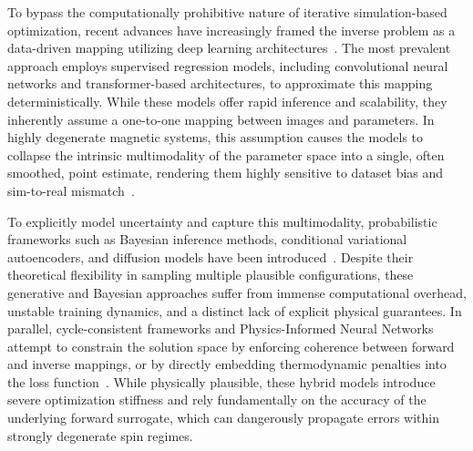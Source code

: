 \documentclass[a4paper,fleqn]{cas-sc}
\begin{document}
To bypass the computationally prohibitive nature of iterative simulation-based optimization, recent advances have increasingly framed the inverse problem as a data-driven mapping utilizing deep learning architectures~\cite{lee2024deep}. The most prevalent approach employs supervised regression models, including convolutional neural networks and transformer-based architectures, to approximate this mapping deterministically. While these models offer rapid inference and scalability, they inherently assume a one-to-one mapping between images and parameters. In highly degenerate magnetic systems, this assumption causes the models to collapse the intrinsic multimodality of the parameter space into a single, often smoothed, point estimate, rendering them highly sensitive to dataset bias and sim-to-real mismatch~\cite{chen2024data}. 

To explicitly model uncertainty and capture this multimodality, probabilistic frameworks such as Bayesian inference methods, conditional variational autoencoders, and diffusion models have been introduced~\cite{lan2022scaling, liu2026bayesian, zhao2023generative, shmakov2023end}. Despite their theoretical flexibility in sampling multiple plausible configurations, these generative and Bayesian approaches suffer from immense computational overhead, unstable training dynamics, and a distinct lack of explicit physical guarantees. In parallel, cycle-consistent frameworks and Physics-Informed Neural Networks attempt to constrain the solution space by enforcing coherence between forward and inverse mappings, or by directly embedding thermodynamic penalties into the loss function~\cite{huang2023cycle, sui2026cyclemamba, baldan2023physics}. While physically plausible, these hybrid models introduce severe optimization stiffness and rely fundamentally on the accuracy of the underlying forward surrogate, which can dangerously propagate errors within strongly degenerate spin regimes.
\end{document}
